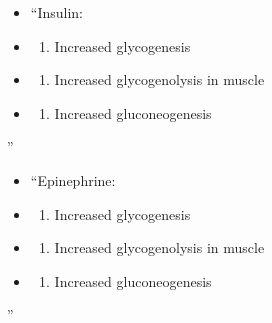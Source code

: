 \documentclass[
]{book}
\providecommand{\tightlist}{%
  \setlength{\itemsep}{0pt}\setlength{\parskip}{0pt}}
\begin{document}
\begin{itemize}
\item
  ``Insulin:
\item
  \begin{enumerate}
  \def\labelenumi{(\Alph{enumi})}
  \tightlist
  \item
    Increased glycogenesis\\
  \end{enumerate}
\item
  \begin{enumerate}
  \def\labelenumi{(\Alph{enumi})}
  \setcounter{enumi}{1}
  \tightlist
  \item
    Increased glycogenolysis in muscle\\
  \end{enumerate}
\item
  \begin{enumerate}
  \def\labelenumi{(\Alph{enumi})}
  \setcounter{enumi}{2}
  \tightlist
  \item
    Increased gluconeogenesis
  \end{enumerate}
\end{itemize}

''

\begin{itemize}
\item
  ``Epinephrine:
\item
  \begin{enumerate}
  \def\labelenumi{(\Alph{enumi})}
  \tightlist
  \item
    Increased glycogenesis\\
  \end{enumerate}
\item
  \begin{enumerate}
  \def\labelenumi{(\Alph{enumi})}
  \setcounter{enumi}{1}
  \tightlist
  \item
    Increased glycogenolysis in muscle\\
  \end{enumerate}
\item
  \begin{enumerate}
  \def\labelenumi{(\Alph{enumi})}
  \setcounter{enumi}{2}
  \tightlist
  \item
    Increased gluconeogenesis
  \end{enumerate}
\end{itemize}

''
\end{document}
